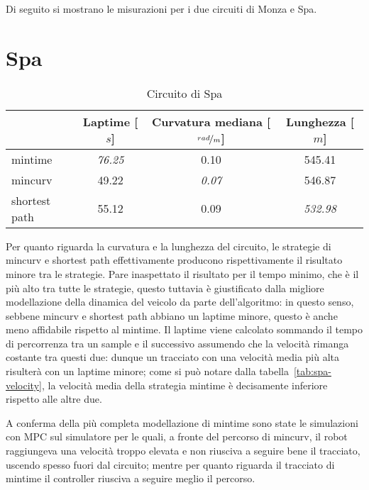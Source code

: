 Di seguito si mostrano le misurazioni per i due circuiti di Monza e Spa.

\section{Spa}

\begin{table}[H]
	\caption{Circuito di Spa}
	\label{tab:opt-spa}
	\begin{center}
		\begin{tabular} {l|c|c|c}
			                & Laptime [$s$]  & Curvatura mediana [$\nicefrac{rad}{m}$] & Lunghezza [$m$]\\
			\hline
			mintime         & \textit{76.25} & 0.10           & 545.41          \\
			mincurv         & 49.22          & \textit{0.07 } & 546.87          \\
			shortest path   & 55.12          & 0.09           & \textit{532.98} \\
			\hline
		\end{tabular}
	\end{center}
\end{table}
Per quanto riguarda la curvatura e la lunghezza del circuito, le strategie di mincurv e shortest path
effettivamente producono rispettivamente il risultato minore tra le strategie. Pare inaspettato il
risultato per il tempo minimo, che è il più alto tra tutte le strategie, questo tuttavia è giustificato
dalla migliore modellazione della dinamica del veicolo da parte dell'algoritmo: in questo senso, sebbene
mincurv e shortest path abbiano un laptime minore, questo è anche meno affidabile rispetto al mintime. Il
laptime viene calcolato sommando il tempo di percorrenza tra un sample e il successivo assumendo che la
velocità rimanga costante tra questi due: dunque un tracciato con una velocità media più alta risulterà
con un laptime minore; come si può notare dalla tabella~\ref{tab:spa-velocity}, la velocità media della
strategia mintime è decisamente inferiore rispetto alle altre due.

A conferma della più completa modellazione di mintime sono state le simulazioni con MPC sul
simulatore per le quali, a fronte del percorso di mincurv, il robot raggiungeva una velocità troppo
elevata e non riusciva a seguire bene il tracciato, uscendo spesso fuori dal circuito; mentre per quanto
riguarda il tracciato di mintime il controller riusciva a seguire meglio il percorso.

